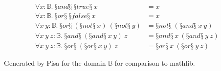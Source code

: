 \begin{conjectureset}[H]
\begin{align}
\forall x : \mathbb{B}.\ §and§\ §true§\ x &= x \label{overlapenum:true_and1}\\
\forall x : \mathbb{B}.\ §or§\ §false§\ x &= x \label{overlapenum:false_or1}\\
\forall x\ y : \mathbb{B}.\ §or§\ (§not§\ x)\ (§not§\ y) &= §not§\ (§and§\ x\ y) \label{overlapenum:not_and1}\\
\forall x\ y\ z : \mathbb{B}.\ §and§\ (§and§\ x\ y)\ z &= §and§\ x\ (§and§\ y\ z) \label{overlapenum:and_assoc1}\\
\forall x\ y\ z : \mathbb{B}.\ §or§\ (§or§\ x\ y)\ z &= §or§\ x\ (§or§\ y\ z) \label{overlapenum:or_assoc1}
\end{align}
\vspace{-0.9cm}
\caption{Generated by Pisa for the domain $\mathbb{B}$ for comparison to mathlib.}\label{eqs:enum:compare}
\end{conjectureset}

